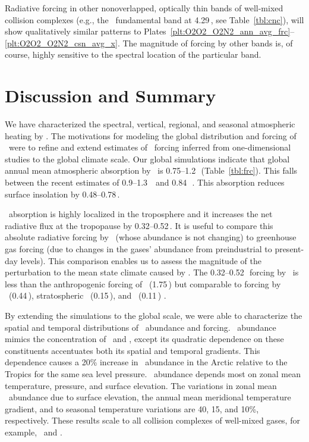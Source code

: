 \documentclass[agupp,twoside]{aguplus} %
\begin{document}
Radiative forcing in other nonoverlapped, optically thin bands of
well-mixed collision complexes (e.g., the \NdNd\ fundamental band at
4.29\,\um, see Table~\ref{tbl:cnc}), will show qualitatively similar
patterns to
Plates~\ref{plt:O2O2_O2N2_ann_avg_frc}--\ref{plt:O2O2_O2N2_csn_avg_x}.   
The magnitude of forcing by other bands is, of course, highly
sensitive to the spectral location of the particular band. 

\section{Discussion and Summary}\label{sxn:dsc} 

We have characterized the spectral, vertical, regional, and seasonal
atmospheric heating by \OdX.
The motivations for modeling the global distribution and forcing of 
\OdX\ were to refine and extend estimates of \OdX\ forcing inferred
from one-dimensional studies to the global climate scale. 
Our global simulations indicate that global annual mean atmospheric
absorption by \OdX\ is 0.75--1.2\,\wxmS\ (Table~\ref{tbl:frc}).  
This falls between the recent estimates of 0.9--1.3\,\wxmS\
\cite[]{SPS98} and 0.84\,\wxmS\ \cite[]{MCB98}. 
This absorption reduces surface insolation by 0.48--0.78\,\wxmS. 

\OdX\ absorption is highly localized in the troposphere and it
increases the net radiative flux at the tropopause by
0.32--0.52\,\wxmS. 
It is useful to compare this absolute radiative forcing by \OdX\
(whose abundance is not changing) to greenhouse gas forcing (due to
changes in the gases' abundance from preindustrial to present-day
levels). 
This comparison enables us to assess the magnitude of the perturbation
to the mean state climate caused by \OdX. 
The 0.32--0.52\,\wxmS\ forcing by \OdX\ is less than the anthropogenic 
forcing of \COd\ (1.75\,\wxmS) but comparable to forcing by \CHq\
(0.44\,\wxmS), stratospheric \HdO\ (0.15\,\wxmS), and \NdO\ (0.11\,\wxmS)
\cite[][p. 57]{SDW90}.   

By extending the simulations to the global scale, we were able to
characterize the spatial and temporal distributions of \OdX\ abundance
and forcing. 
\OdX\ abundance mimics the concentration of \Od\ and \Nd, except its
quadratic dependence on these constituents accentuates both its
spatial and temporal gradients.
This dependence causes a 20\% increase in \OdX\ abundance in the 
Arctic relative to the Tropics for the same sea level pressure.  
\OdX\ abundance depends most on zonal mean temperature, pressure,
and surface elevation.
The variations in zonal mean \OdX\ abundance due to surface elevation,
the annual mean meridional temperature gradient, and to seasonal
temperature variations are 40, 15, and 10\%, respectively.    
These results scale to all collision complexes of well-mixed gases,
for example, \NdNd\ and \OdAr.
\end{document}
